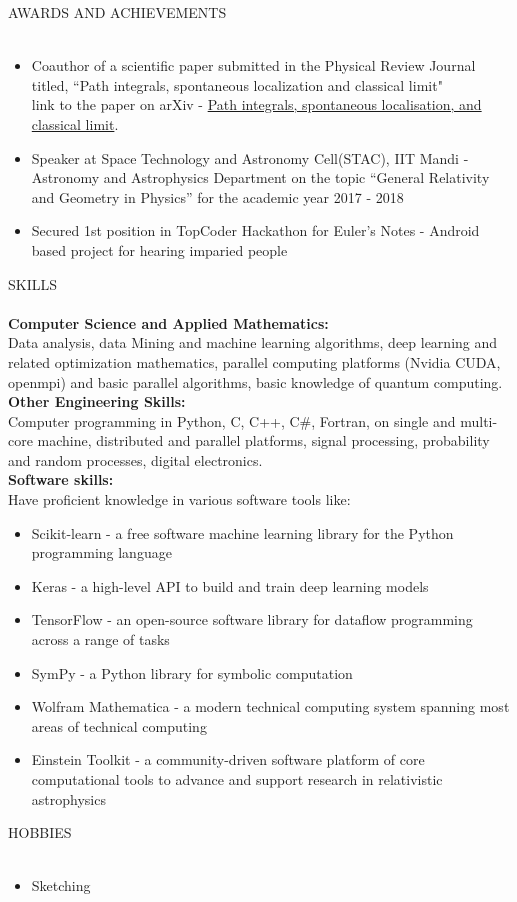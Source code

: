 \documentclass[a4paper]{article}
\newcommand{\lineunder} {
    \vspace*{-8pt} \\
    \hspace*{-18pt} \hrulefill \\
}
\newcommand{\header} [1] {
    {\hspace*{-18pt}\vspace*{6pt} \textsc{#1}}
    \vspace*{-6pt} \lineunder
}
\begin{document}
\header{AWARDS AND ACHIEVEMENTS}
\begin{itemize} \itemsep 1pt
    \item Coauthor of a scientific paper submitted in the Physical Review Journal titled, “Path integrals, spontaneous localization and classical limit"\\
    link to the paper on arXiv - \href{https://bit.ly/2AOwPsf}{Path integrals, spontaneous localisation, and classical limit}.
    \item Speaker at Space Technology and Astronomy Cell(STAC), IIT Mandi - Astronomy and Astrophysics Department on the topic “General Relativity and Geometry in Physics” for the academic year 2017 - 2018 \\
    \item Secured 1st position in TopCoder Hackathon for Euler’s Notes - Android based project for hearing imparied people \\
\end{itemize}
\vspace{2mm}

\header{SKILLS}
\textbf{Computer Science and Applied Mathematics: }\\
Data analysis, data Mining and machine learning algorithms, deep learning and related optimization mathematics, parallel computing platforms (Nvidia CUDA, openmpi) and basic parallel algorithms, basic knowledge of quantum computing. \\
\vspace*{2mm}
\textbf{Other Engineering Skills: } \\
Computer programming in Python, C, C++, C\#, Fortran, on single and multi-core machine, distributed and parallel platforms, signal processing, probability and random processes, digital electronics. \\
\vspace*{2mm}
\textbf{Software skills: }\\
Have proficient knowledge in various software tools like:
\begin{itemize} \itemsep 1pt
    \item Scikit-learn - a free software machine learning library for the Python programming language \\
    \item  Keras - a high-level API to build and train deep learning models \\
    \item TensorFlow - an open-source software library for dataflow programming across a range of tasks \\
    \item SymPy - a Python library for symbolic computation \\
    \item Wolfram Mathematica - a modern technical computing system spanning most areas of technical computing \\
    \item Einstein Toolkit - a community-driven software platform of core computational tools to advance and support research in relativistic astrophysics \\
\end{itemize}
\vspace{2mm}

\header{HOBBIES}
\begin{itemize}
\item Sketching
\end{itemize}
\vspace{2mm}
\ 
\end{document}
